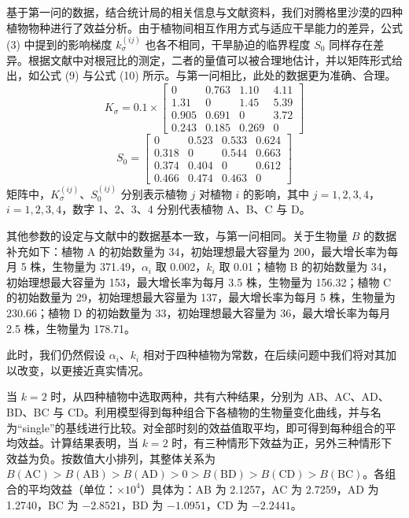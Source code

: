 \documentclass[11pt,a4paper]{ctexart}
\begin{document}
基于第一问的数据，结合统计局的相关信息与文献资料，我们对腾格里沙漠的四种植物物种进行了效益分析。由于植物间相互作用方式与适应干旱能力的差异，公式 (3) 中提到的影响梯度 $k^{(ij)}_{\sigma}$ 也各不相同，干旱胁迫的临界程度 $S_0$ 同样存在差异。根据文献中对根冠比的测定，二者的量值可以被合理地估计，并以矩阵形式给出，如公式 (9) 与公式 (10) 所示。与第一问相比，此处的数据更为准确、合理。
\begin{equation}
K_{\sigma}=0.1\times
\begin{bmatrix}
0 & 0.763 & 1.10 & 4.11\\
1.31 & 0 & 1.45 & 5.39\\
0.905 & 0.691 & 0 & 3.72\\
0.243 & 0.185 & 0.269 & 0
\end{bmatrix}
\end{equation}
\begin{equation}
S_0=
\begin{bmatrix}
0 & 0.523 & 0.533 & 0.624\\
0.318 & 0 & 0.544 & 0.663\\
0.374 & 0.404 & 0 & 0.612\\
0.466 & 0.474 & 0.463 & 0
\end{bmatrix}
\end{equation}
矩阵中，$K^{(ij)}_{\sigma}$、$S^{(ij)}_{0}$ 分别表示植物 $j$ 对植物 $i$ 的影响，其中 $j=1,2,3,4$，$i=1,2,3,4$，数字 1、2、3、4 分别代表植物 A、B、C 与 D。

其他参数的设定与文献中的数据基本一致，与第一问相同。关于生物量 $B$ 的数据补充如下：植物 A 的初始数量为 34，初始理想最大容量为 200，最大增长率为每月 5 株，生物量为 371.49，$\alpha_i$ 取 0.002，$k_i$ 取 0.01；植物 B 的初始数量为 34，初始理想最大容量为 153，最大增长率为每月 3.5 株，生物量为 156.32；植物 C 的初始数量为 29，初始理想最大容量为 137，最大增长率为每月 5 株，生物量为 230.66；植物 D 的初始数量为 33，初始理想最大容量为 36，最大增长率为每月 2.5 株，生物量为 178.71。

此时，我们仍然假设 $\alpha_i$、$k_i$ 相对于四种植物为常数，在后续问题中我们将对其加以改变，以更接近真实情况。

当 $k=2$ 时，从四种植物中选取两种，共有六种结果，分别为 AB、AC、AD、BD、BC 与 CD。利用模型得到每种组合下各植物的生物量变化曲线，并与名为“single”的基线进行比较。对全部时刻的效益值取平均，即可得到每种组合的平均效益。计算结果表明，当 $k=2$ 时，有三种情形下效益为正，另外三种情形下效益为负。按数值大小排列，其整体关系为 $B(\mathrm{AC})>B(\mathrm{AB})>B(\mathrm{AD})>0>B(\mathrm{BD})>B(\mathrm{CD})>B(\mathrm{BC})$。各组合的平均效益（单位：$\times10^{4}$）具体为：AB 为 2.1257，AC 为 2.7259，AD 为 1.2740，BC 为 $-2.8521$，BD 为 $-1.0951$，CD 为 $-2.2441$。
\end{document}
